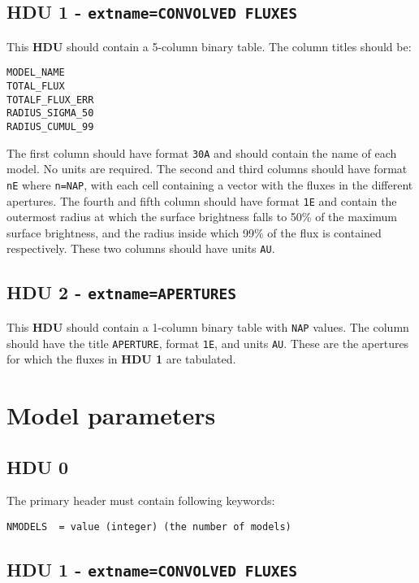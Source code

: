 \documentclass[11pt]{article}
\begin{document}
\subsection{HDU 1  - \texttt{extname=CONVOLVED FLUXES}}

This \textbf{HDU} should contain a 5-column binary table. The column titles should be:

\begin{verbatim}
MODEL_NAME
TOTAL_FLUX
TOTALF_FLUX_ERR
RADIUS_SIGMA_50
RADIUS_CUMUL_99
\end{verbatim}

The first column should have format \texttt{30A} and should contain the name of each model. No units are required. The second and third columns should have format \texttt{nE} where \texttt{n=NAP}, with each cell containing a vector with the fluxes in the different apertures. The fourth and fifth column should have format \texttt{1E} and contain the outermost radius at which the surface brightness falls to 50\% of the maximum surface brightness, and the radius inside which 99\% of the flux is contained respectively. These two columns should have units \texttt{AU}.

\subsection{HDU 2 - \texttt{extname=APERTURES}}

This \textbf{HDU} should contain a 1-column binary table with \texttt{NAP}
values. The column should have the title \texttt{APERTURE}, format \texttt{1E}, and units \texttt{AU}. These are the apertures for which the fluxes in \textbf{HDU 1} are tabulated.

\section{Model parameters}

\subsection{HDU 0}

The primary header must contain following keywords:

\begin{verbatim}
NMODELS  = value (integer) (the number of models)
\end{verbatim}

\subsection{HDU 1  - \texttt{extname=CONVOLVED FLUXES}}
\end{document}
